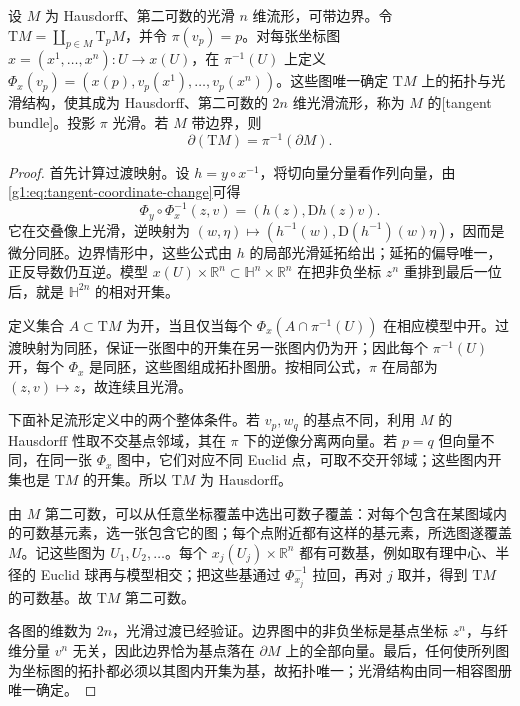 \begin{theorem}
	\label{g1:thm:tangent-bundle-atlas}
	设 \(M\) 为 Hausdorff、第二可数的光滑 \(n\) 维流形，可带边界。令 \(\mathrm{T}M=\coprod_{p\in M}\mathrm{T}_pM\)，并令 \(\pi(v_p)=p\)。对每张坐标图 \(x=(x^1,\ldots,x^n):U\to x(U)\)，在 \(\pi^{-1}(U)\) 上定义 \(\Phi_x(v_p)=(x(p),v_p(x^1),\ldots,v_p(x^n))\)。这些图唯一确定 \(\mathrm{T}M\) 上的拓扑与光滑结构，使其成为 Hausdorff、第二可数的 \(2n\) 维光滑流形，称为 \(M\) 的[tangent bundle]。投影 \(\pi\) 光滑。若 \(M\) 带边界，则
	\[
		\partial(\mathrm{T}M)=\pi^{-1}(\partial M).
	\]
\end{theorem}
\begin{proof}
	首先计算过渡映射。设 \(h=y\circ x^{-1}\)，将切向量分量看作列向量，由\eqref{g1:eq:tangent-coordinate-change}可得
	\begin{equation}
		\label{g1:eq:tangent-bundle-transition}
		\Phi_y\circ\Phi_x^{-1}(z,v)=(h(z),\mathrm{D}h(z)v).
	\end{equation}
	它在交叠像上光滑，逆映射为 \((w,\eta)\mapsto(h^{-1}(w),\mathrm{D}(h^{-1})(w)\eta)\)，因而是微分同胚。边界情形中，这些公式由 \(h\) 的局部光滑延拓给出；延拓的偏导唯一，正反导数仍互逆。模型 \(x(U)\times\mathbb R^n\subset\mathbb H^n\times\mathbb R^n\) 在把非负坐标 \(z^n\) 重排到最后一位后，就是 \(\mathbb H^{2n}\) 的相对开集。

	定义集合 \(A\subset \mathrm{T}M\) 为开，当且仅当每个 \(\Phi_x(A\cap\pi^{-1}(U))\) 在相应模型中开。过渡映射为同胚，保证一张图中的开集在另一张图内仍为开；因此每个 \(\pi^{-1}(U)\) 开，每个 \(\Phi_x\) 是同胚，这些图组成拓扑图册。按相同公式，\(\pi\) 在局部为 \((z,v)\mapsto z\)，故连续且光滑。

	下面补足流形定义中的两个整体条件。若 \(v_p,w_q\) 的基点不同，利用 \(M\) 的 Hausdorff 性取不交基点邻域，其在 \(\pi\) 下的逆像分离两向量。若 \(p=q\) 但向量不同，在同一张 \(\Phi_x\) 图中，它们对应不同 Euclid 点，可取不交开邻域；这些图内开集也是 \(\mathrm{T}M\) 的开集。所以 \(\mathrm{T}M\) 为 Hausdorff。

	由 \(M\) 第二可数，可以从任意坐标覆盖中选出可数子覆盖：对每个包含在某图域内的可数基元素，选一张包含它的图；每个点附近都有这样的基元素，所选图遂覆盖 \(M\)。记这些图为 \(U_1,U_2,\ldots\)。每个 \(x_j(U_j)\times\mathbb R^n\) 都有可数基，例如取有理中心、半径的 Euclid 球再与模型相交；把这些基通过 \(\Phi_{x_j}^{-1}\) 拉回，再对 \(j\) 取并，得到 \(\mathrm{T}M\) 的可数基。故 \(\mathrm{T}M\) 第二可数。

	各图的维数为 \(2n\)，光滑过渡已经验证。边界图中的非负坐标是基点坐标 \(z^n\)，与纤维分量 \(v^n\) 无关，因此边界恰为基点落在 \(\partial M\) 上的全部向量。最后，任何使所列图为坐标图的拓扑都必须以其图内开集为基，故拓扑唯一；光滑结构由同一相容图册唯一确定。
\end{proof}

